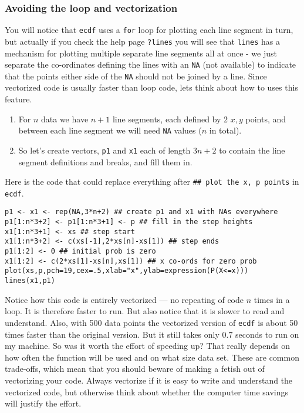 \documentclass[10pt] {article}
\theoremstyle{definition}
\begin{document}
\subsubsection{Avoiding the loop and vectorization}
You will notice that {\tt ecdf} uses a {\tt for} loop for plotting each line segment in turn, but actually if you check the help page {\tt ?lines} you will see that {\tt lines} has a mechanism for plotting multiple separate line segments all at once - we just separate the co-ordinates defining the lines with an {\tt NA} (not available) to indicate that the points either side of the {\tt NA} should not be joined by a line. Since vectorized code is usually faster than loop code, lets think about how to uses this feature.
\begin{enumerate}
\item For $n$ data we have $n+1$ line segments, each defined by 2 $x,y$ points, and between each line segment we will need {\tt NA} values ($n$ in total). 
\item So let's create vectors, {\tt p1} and {\tt x1} each of length $3n+2$ to contain the line segment definitions and breaks, and fill them in.
\end{enumerate}
Here is the code that could replace everything after \lstinline+## plot the x, p points+ in {\tt ecdf}.
\begin{lstlisting}
p1 <- x1 <- rep(NA,3*n+2) ## create p1 and x1 with NAs everywhere
p1[1:n*3+2] <- p1[1:n*3+1] <- p ## fill in the step heights
x1[1:n*3+1] <- xs ## step start
x1[1:n*3+2] <- c(xs[-1],2*xs[n]-xs[1]) ## step ends
p1[1:2] <- 0 ## initial prob is zero
x1[1:2] <- c(2*xs[1]-xs[n],xs[1]) ## x co-ords for zero prob
plot(xs,p,pch=19,cex=.5,xlab="x",ylab=expression(P(X<=x)))
lines(x1,p1)
\end{lstlisting}
Notice how this code is entirely vectorized --- no repeating of code $n$ times in a loop. It is therefore faster to run. But also notice that it is slower to read and understand. Also, with 500 data points the vectorized version of {\tt ecdf} is about 50 times faster than the original version. But it still takes only 0.7 seconds to run on my machine. So was it worth the effort of speeding up? That really depends on how often the function will be used and on what size data set. These are common trade-offs, which mean that you should beware of making a fetish out of vectorizing your code. Always vectorize if it is easy to write and understand the vectorized code, but otherwise think about whether the computer time savings will justify the effort.  
\end{document}
